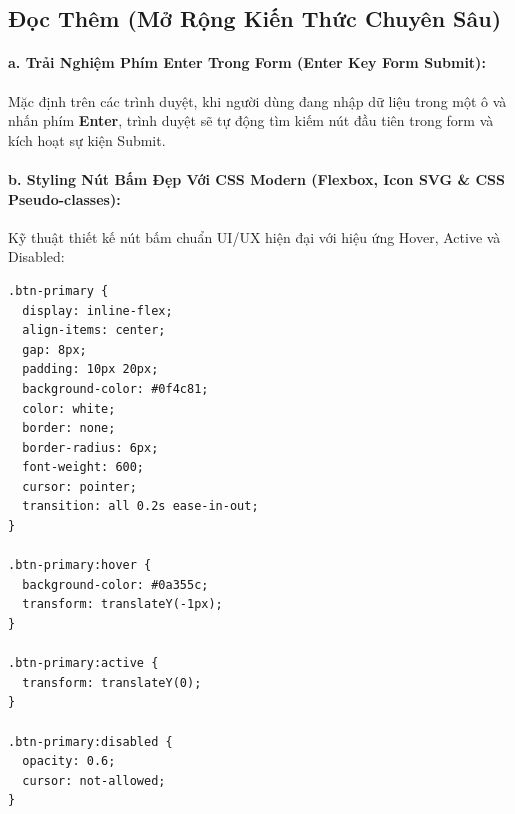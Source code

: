 \subsection{Đọc Thêm (Mở Rộng Kiến Thức Chuyên Sâu)}
\label{subsec:buttons_advanced_readmore}

\paragraph{a. Trải Nghiệm Phím Enter Trong Form (Enter Key Form Submit):}
Mặc định trên các trình duyệt, khi người dùng đang nhập dữ liệu trong một ô  và nhấn phím \textbf{Enter}, trình duyệt sẽ tự động tìm kiếm nút  đầu tiên trong form và kích hoạt sự kiện Submit.

\paragraph{b. Styling Nút Bấm Đẹp Với CSS Modern (Flexbox, Icon SVG \& CSS Pseudo-classes):}
Kỹ thuật thiết kế nút bấm chuẩn UI/UX hiện đại với hiệu ứng Hover, Active và Disabled:

\begin{codeWindow}
\begin{lstlisting}[language=HTML5]
.btn-primary {
  display: inline-flex;
  align-items: center;
  gap: 8px;
  padding: 10px 20px;
  background-color: #0f4c81;
  color: white;
  border: none;
  border-radius: 6px;
  font-weight: 600;
  cursor: pointer;
  transition: all 0.2s ease-in-out;
}

.btn-primary:hover {
  background-color: #0a355c;
  transform: translateY(-1px);
}

.btn-primary:active {
  transform: translateY(0);
}

.btn-primary:disabled {
  opacity: 0.6;
  cursor: not-allowed;
}
\end{lstlisting}
\end{codeWindow}

\begin{browserWindow}
\sffamily\small
{} \qquad
{}
\end{browserWindow}

